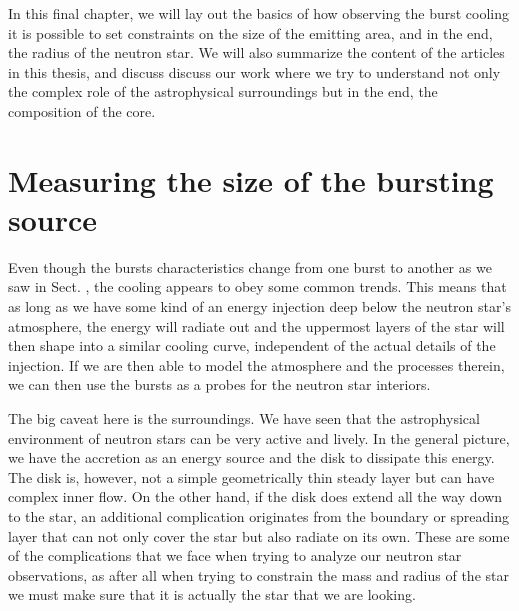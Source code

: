 In this final chapter, we will lay out the basics of how observing the burst cooling it is possible to set constraints on the size of the emitting area, and in the end, the radius of the neutron star.
We will also summarize the content of the articles in this thesis, and discuss discuss our work where we try to understand not only the complex role of the astrophysical surroundings but in the end, the composition of the core.


\section{Measuring the size of the bursting source}

Even though the bursts characteristics change from one burst to another as we saw in Sect. , the cooling appears to obey some common trends.
This means that as long as we have some kind of an energy injection deep below the neutron star's atmosphere, the energy will radiate out and the uppermost layers of the star will then shape into a similar cooling curve, independent of the actual details of the injection.
If we are then able to model the atmosphere and the processes therein, we can then use the bursts as a probes for the neutron star interiors.




The big caveat here is the surroundings.
We have seen that the astrophysical environment of neutron stars can be very active and lively.
In the general picture, we have the accretion as an energy source and the disk to dissipate this energy.
The disk is, however, not a simple geometrically thin steady layer but can have complex inner flow.
On the other hand, if the disk does extend all the way down to the star, an additional complication originates from the boundary or spreading layer that can not only cover the star but also radiate on its own.
These are some of the complications that we face when trying to analyze our neutron star observations, as after all when trying to constrain the mass and radius of the star we must make sure that it is actually the star that we are looking.





